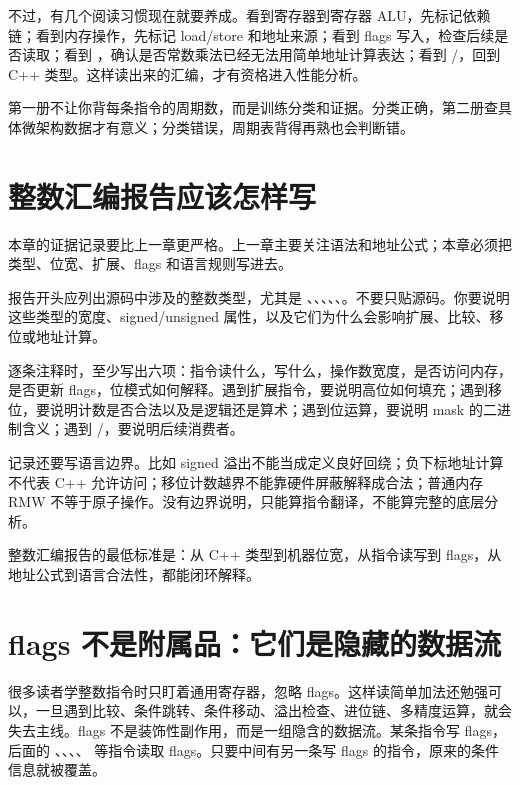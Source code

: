 不过，有几个阅读习惯现在就要养成。看到寄存器到寄存器 ALU，先标记依赖链；看到内存操作，先标记 load/store 和地址来源；看到 flags 写入，检查后续是否读取；看到 ，确认是否常数乘法已经无法用简单地址计算表达；看到 /，回到 C++ 类型。这样读出来的汇编，才有资格进入性能分析。

\begin{mentalmodel}
第一册不让你背每条指令的周期数，而是训练分类和证据。分类正确，第二册查具体微架构数据才有意义；分类错误，周期表背得再熟也会判断错。
\end{mentalmodel}

\section{整数汇编报告应该怎样写}

本章的证据记录要比上一章更严格。上一章主要关注语法和地址公式；本章必须把类型、位宽、扩展、flags 和语言规则写进去。

报告开头应列出源码中涉及的整数类型，尤其是 、、、、、。不要只贴源码。你要说明这些类型的宽度、signed/unsigned 属性，以及它们为什么会影响扩展、比较、移位或地址计算。

逐条注释时，至少写出六项：指令读什么，写什么，操作数宽度，是否访问内存，是否更新 flags，位模式如何解释。遇到扩展指令，要说明高位如何填充；遇到移位，要说明计数是否合法以及是逻辑还是算术；遇到位运算，要说明 mask 的二进制含义；遇到 /，要说明后续消费者。

记录还要写语言边界。比如 signed 溢出不能当成定义良好回绕；负下标地址计算不代表 C++ 允许访问；移位计数越界不能靠硬件屏蔽解释成合法；普通内存 RMW 不等于原子操作。没有边界说明，只能算指令翻译，不能算完整的底层分析。

\begin{keyidea}
整数汇编报告的最低标准是：从 C++ 类型到机器位宽，从指令读写到 flags，从地址公式到语言合法性，都能闭环解释。
\end{keyidea}

\section{flags 不是附属品：它们是隐藏的数据流}

很多读者学整数指令时只盯着通用寄存器，忽略 flags。这样读简单加法还勉强可以，一旦遇到比较、条件跳转、条件移动、溢出检查、进位链、多精度运算，就会失去主线。flags 不是装饰性副作用，而是一组隐含的数据流。某条指令写 flags，后面的 、、、、 等指令读取 flags。只要中间有另一条写 flags 的指令，原来的条件信息就被覆盖。

